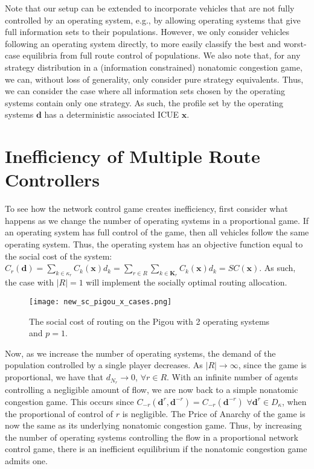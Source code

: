 \documentclass{article}
\begin{document}
    Note that our setup can be extended to incorporate vehicles that are not fully controlled by an operating system, e.g., by allowing operating systems that give full information sets to their populations. However, we only consider vehicles following an operating system directly, to more easily classify the best and worst-case equilibria from full route control of populations. We also note that, for any strategy distribution in a (information constrained) nonatomic congestion game, we can, without loss of generality, only consider pure strategy equivalents. Thus, we can consider the case where all information sets chosen by the operating systems contain only one strategy. As such, the profile set by the operating systems $\bm{d}$ has a deterministic associated ICUE $\bm{x}$.
    
\section{Inefficiency of Multiple Route Controllers} \label{sec:ineff}
    To see how the network control game creates inefficiency, first consider what happens as we change the number of operating systems in a proportional game. If an operating system has full control of the game, then all vehicles follow the same operating system. Thus, the operating system has an objective function equal to the social cost of the system: $C_r(\bm{d})=\sum_{k \in \kappa_r} C_{k}(\bm{x})d_k=\sum_{r \in R} \sum_{k \in \bm{K}_r} C_{k} (\bm{x})d_{k} = SC(\bm{x})$. As such, the case with $|R|=1$ will implement the socially optimal routing allocation.
    \begin{figure}[b!]
    \centering
    \texttt{[image: new\_sc\_pigou\_x\_cases.png]}
    \caption{The social cost of routing on the Pigou with 2 operating systems and $p=1$.}
    \label{fig:pigou_sc}
    \end{figure}
    
    Now, as we increase the number of operating systems, the demand of the population controlled by a single player decreases. As $|R| \rightarrow \infty$, since the game is proportional, we have that $d_{N_r} \rightarrow 0$, $\forall r \in R$. With an infinite number of agents controlling a negligible amount of flow, we are now back to a simple nonatomic congestion game. This occurs since $C_{-r}(\bm{d}^r,\bm{d}^{-r})=C_{-r}(\bm{d}^{-r})$ $\forall \bm{d}^r \in D_\kappa$, when the proportional of control of $r$ is negligible. The Price of Anarchy of the game is now the same as its underlying nonatomic congestion game. Thus, by increasing the number of operating systems controlling the flow in a proportional network control game, there is an inefficient equilibrium if the nonatomic congestion game admits one.
    
\end{document}
